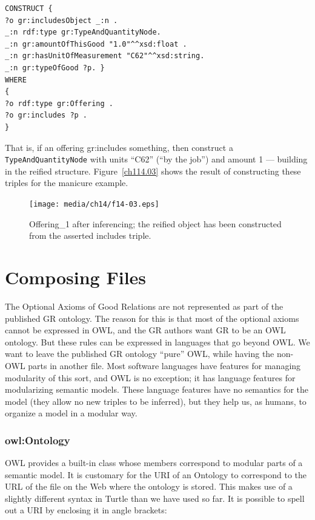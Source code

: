 \begin{lstlisting}
CONSTRUCT {
?o gr:includesObject _:n .
_:n rdf:type gr:TypeAndQuantityNode.
_:n gr:amountOfThisGood "1.0"^^xsd:float .
_:n gr:hasUnitOfMeasurement "C62"^^xsd:string.
_:n gr:typeOfGood ?p. }
WHERE
{
?o rdf:type gr:Offering .
?o gr:includes ?p . 
}
\end{lstlisting}

That is, if an offering gr:includes something, then construct a
\texttt{TypeAndQuantityNode} with units ``C62'' (``by the job'') and amount
1 --- building in the reified structure. Figure~\ref{ch114.03} shows the result of
constructing these triples for the manicure example.



\begin{figure}
\centering
\texttt{[image: media/ch14/f14-03.eps]}
\caption{Offering\_1 after inferencing; the reified object has been constructed
from the asserted includes triple.
}
\label{fig:ch14.03}
\end{figure}




\section{Composing Files}

The Optional Axioms of Good Relations are not represented as part of the
published GR ontology. The reason for this is that most of the optional
axioms cannot be expressed in OWL, and the GR authors want GR to be an
OWL ontology. But these rules can be expressed in languages that go
beyond OWL. We want to leave the published GR ontology ``pure'' OWL,
while having the non-OWL parts in another file. Most software languages
have features for managing modularity of this sort, and OWL is no
exception; it has language features for modularizing semantic models.
These language features have no semantics for the model (they allow no
new triples to be inferred), but they help us, as humans, to organize a
model in a modular way.

\subsubsection{owl:Ontology}

OWL provides a built-in class whose members correspond to modular parts
of a semantic model. It is customary for the URI of an Ontology to
correspond to the URL of the file on the Web where the ontology is
stored. This makes use of a slightly different syntax in Turtle than we
have used so far. It is possible to spell out a URI by enclosing it in
angle brackets:

